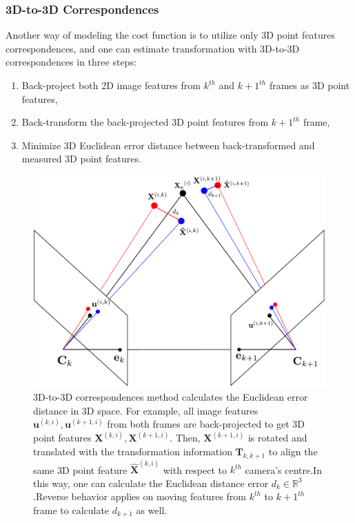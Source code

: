 \documentclass[a4paper]{report}
\numberwithin{figure}{section}
\newcommand{\R}{\mathbb{R}}
\begin{document}
\subsubsection{3D-to-3D Correspondences}\label{sb_sc_3d_to_3d}

Another way of modeling the cost function is to utilize only 3D point features 
correspondences, and one can estimate transformation with 3D-to-3D 
correspondences in three steps:

\begin{enumerate}
  \item Back-project both 2D image features from $k^{th}$ and $k+1^{th}$ 
  frames as 3D point features, 
  \item Back-transform the back-projected 3D point features from $k+1^{th}$ 
  frame,
  \item Minimize 3D Euclidean error distance between back-transformed and 
  measured 3D point features.
\end{enumerate}

\begin{figure}[H]
	\centering
	\includegraphics[width=0.9\linewidth,natwidth=640,natheight=640]
	{fig/drawings/3d_to_3d.pdf}
	\caption[3D-to-3D Correspondences]
	{3D-to-3D correspondences method calculates the Euclidean error distance 
	in 
	3D space. For example, all image features 
	$\mathbf{u}^{(k,i)},\mathbf{u}^{(k+1,i)}$ from both frames are 
	back-projected to get 3D point features 
	$\mathbf{X}^{(k,i)},\mathbf{X}^{(k+1,i)}$. Then, $\mathbf{X}^{(k+1,i)}$ is 
	rotated and translated with the transformation information 
	$\mathbf{T}_{k,k+1}$ to align the same 3D point feature 
	$\mathbf{\hat{X}}^{(k,i)}$ with respect to $k^{th}$ camera's centre.In 
	this 
	way, one can calculate the Euclidean distance error $d_k \in \R^3$.Reverse 
	behavior applies on moving features from $k^{th}$ to $k+1^{th}$ frame to 
	calculate $d_{k+1}$ as well.}
	\label{fig:min_euclidean_error}
\end{figure}
\end{document}
